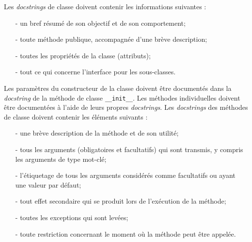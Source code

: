 \documentclass[a4paper,12pt]{book}
\begin{document}
Les \textit{docstrings} de classe doivent contenir les informations suivantes :
\begin{itemize}
	\item[-] un bref résumé de son objectif et de son comportement;
	\item[-] toute méthode publique, accompagnée d'une brève description;
	\item[-] toutes les propriétés de la classe (attributs);
	\item[-] tout ce qui concerne l'interface pour les sous-classes.
\end{itemize}
\medskip

Les paramètres du constructeur de la classe doivent être documentés dans la \textit{docstring} de la méthode de classe \texttt{\_\_init\_\_}. Les méthodes individuelles doivent être documentées à l'aide de leurs propres \textit{docstrings}. Les \textit{docstrings} des méthodes de classe doivent contenir les éléments suivants :
\begin{itemize}
	\item[-] une brève description de la méthode et de son utilité;
	\item[-] tous les arguments (obligatoires et facultatifs) qui sont transmis, y compris les arguments de type mot-clé;
	\item[-] l'étiquetage de tous les arguments considérés comme facultatifs ou ayant une valeur par défaut;
	\item[-] tout effet secondaire qui se produit lors de l'exécution de la méthode;
	\item[-] toutes les exceptions qui sont levées;
	\item[-] toute restriction concernant le moment où la méthode peut être appelée.
\end{itemize}
\medskip
\end{document}

